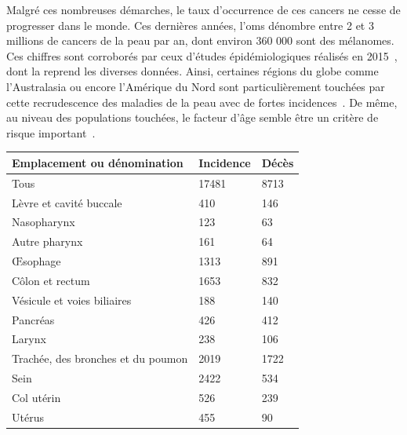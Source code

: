 Malgré ces nombreuses démarches, le taux d’occurrence de ces cancers ne cesse de progresser dans le monde. Ces dernières années, l'\gls{oms} dénombre entre 2 et 3 millions de cancers de la peau par an, dont environ 360 000 sont des mélanomes. Ces chiffres sont corroborés par ceux d'études épidémiologiques réalisés en 2015~\cite{Vos2016}, dont la  reprend les diverses données. Ainsi, certaines régions du globe comme l'Australasia ou encore l'Amérique du Nord sont particulièrement touchées par cette recrudescence des maladies de la peau avec de fortes incidences~\cite{Karimkhani2017}. De même, au niveau des populations touchées, le facteur d'âge semble être un critère de risque important~\cite{Karimkhani2017}.\par 

\begin{table}[H]
    \centering
    \begin{tabular}{lll}
    \toprule
    \textbf{Emplacement ou dénomination}& \textbf{Incidence}& \textbf{Décès}\\ \midrule
    Tous                                & 17481             & 8713          \\  
    Lèvre et cavité buccale             & 410               & 146           \\  
    Nasopharynx                         & 123               & 63            \\  
    Autre pharynx                       & 161               & 64            \\  
    Œsophage                            & 1313              & 891           \\  
    Côlon et rectum                     & 1653              & 832           \\
    Vésicule et voies biliaires         & 188               & 140           \\
    Pancréas                            & 426               & 412           \\
    Larynx                              & 238               & 106           \\
    Trachée, des bronches et du poumon  & 2019              & 1722          \\
    Sein                                & 2422              & 534           \\
    Col utérin                          & 526               & 239           \\
    Utérus                              & 455               & 90            \\

\end{tabular}
\end{table}
